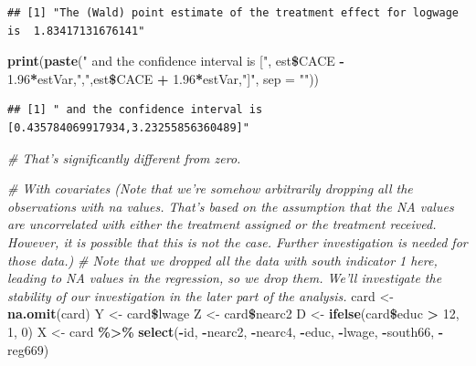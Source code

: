 \documentclass[]{article}
\newenvironment{Shaded}{\begin{snugshade}}{\end{snugshade}}
\newcommand{\KeywordTok}[1]{\textcolor[rgb]{0.13,0.29,0.53}{\textbf{#1}}}
\newcommand{\DataTypeTok}[1]{\textcolor[rgb]{0.13,0.29,0.53}{#1}}
\newcommand{\DecValTok}[1]{\textcolor[rgb]{0.00,0.00,0.81}{#1}}
\newcommand{\FloatTok}[1]{\textcolor[rgb]{0.00,0.00,0.81}{#1}}
\newcommand{\StringTok}[1]{\textcolor[rgb]{0.31,0.60,0.02}{#1}}
\newcommand{\CommentTok}[1]{\textcolor[rgb]{0.56,0.35,0.01}{\textit{#1}}}
\newcommand{\OperatorTok}[1]{\textcolor[rgb]{0.81,0.36,0.00}{\textbf{#1}}}
\newcommand{\NormalTok}[1]{#1}
\begin{document}
\begin{verbatim}
## [1] "The (Wald) point estimate of the treatment effect for logwage is  1.83417131676141"
\end{verbatim}

\begin{Shaded}
\begin{Highlighting}[]
\KeywordTok{print}\NormalTok{(}\KeywordTok{paste}\NormalTok{(}\StringTok{" and the confidence interval is ["}\NormalTok{, est}\OperatorTok{\$}\NormalTok{CACE }\OperatorTok{-}\StringTok{ }\FloatTok{1.96}\OperatorTok{*}\NormalTok{estVar,}\StringTok{","}\NormalTok{,est}\OperatorTok{\$}\NormalTok{CACE }\OperatorTok{+}\StringTok{ }\FloatTok{1.96}\OperatorTok{*}\NormalTok{estVar,}\StringTok{"]"}\NormalTok{, }\DataTypeTok{sep =} \StringTok{""}\NormalTok{))}
\end{Highlighting}
\end{Shaded}

\begin{verbatim}
## [1] " and the confidence interval is [0.435784069917934,3.23255856360489]"
\end{verbatim}

\begin{Shaded}
\begin{Highlighting}[]
\CommentTok{# That's significantly different from zero.}
\end{Highlighting}
\end{Shaded}

\begin{Shaded}
\begin{Highlighting}[]
\CommentTok{# With covariates (Note that we're somehow arbitrarily dropping all the observations with na values. That's based on the assumption that the NA values are uncorrelated with either the treatment assigned or the treatment received. However, it is possible that this is not the case. Further investigation is needed for those data.)}
\CommentTok{# Note that we dropped all the data with south indicator 1 here, leading to NA values in the regression, so we drop them. We'll investigate the stability of our investigation in the later part of the analysis.}
\NormalTok{card <-}\StringTok{ }\KeywordTok{na.omit}\NormalTok{(card)}
\NormalTok{Y <-}\StringTok{ }\NormalTok{card}\OperatorTok{\$}\NormalTok{lwage}
\NormalTok{Z <-}\StringTok{ }\NormalTok{card}\OperatorTok{\$}\NormalTok{nearc2}
\NormalTok{D <-}\StringTok{ }\KeywordTok{ifelse}\NormalTok{(card}\OperatorTok{\$}\NormalTok{educ }\OperatorTok{>}\StringTok{ }\DecValTok{12}\NormalTok{, }\DecValTok{1}\NormalTok{, }\DecValTok{0}\NormalTok{)}
\NormalTok{X <-}\StringTok{ }\NormalTok{card }\OperatorTok{\%>\%}\StringTok{ }\KeywordTok{select}\NormalTok{(}\OperatorTok{-}\NormalTok{id, }\OperatorTok{-}\NormalTok{nearc2, }\OperatorTok{-}\NormalTok{nearc4, }\OperatorTok{-}\NormalTok{educ, }\OperatorTok{-}\NormalTok{lwage, }\OperatorTok{-}\NormalTok{south66, }\OperatorTok{-}\NormalTok{reg669)}
\end{Highlighting}
\end{Shaded}
\end{document}
